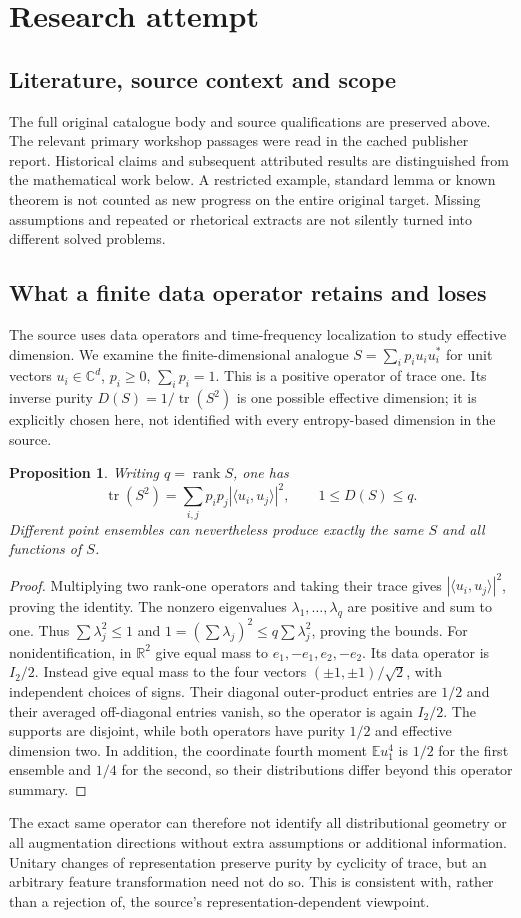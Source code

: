 \documentclass[11pt]{article}
\newtheorem{proposition}{Proposition}
\begin{document}
\section{Research attempt}
\subsection{Literature, source context and scope}
The full original catalogue body and source qualifications are preserved above. The relevant primary workshop passages were read in the cached publisher report. Historical claims and subsequent attributed results are distinguished from the mathematical work below. A restricted example, standard lemma or known theorem is not counted as new progress on the entire original target. Missing assumptions and repeated or rhetorical extracts are not silently turned into different solved problems.

\subsection{What a finite data operator retains and loses}
The source uses data operators and time-frequency localization to study effective dimension. We examine the finite-dimensional analogue $S=\sum_i p_i u_i u_i^*$ for unit vectors $u_i\in\mathbb C^d$, $p_i\ge0$, $\sum_i p_i=1$. This is a positive operator of trace one. Its inverse purity $D(S)=1/\operatorname{tr}(S^2)$ is one possible effective dimension; it is explicitly chosen here, not identified with every entropy-based dimension in the source.
\begin{proposition}
Writing $q=\operatorname{rank}S$, one has
\[
\operatorname{tr}(S^2)=\sum_{i,j}p_ip_j|\langle u_i,u_j\rangle|^2,
\qquad1\le D(S)\le q.
\]
Different point ensembles can nevertheless produce exactly the same $S$ and all functions of $S$.
\end{proposition}
\begin{proof}
Multiplying two rank-one operators and taking their trace gives $|\langle u_i,u_j\rangle|^2$, proving the identity. The nonzero eigenvalues $\lambda_1,\ldots,\lambda_q$ are positive and sum to one. Thus $\sum\lambda_j^2\le1$ and $1=(\sum\lambda_j)^2\le q\sum\lambda_j^2$, proving the bounds.
For nonidentification, in $\mathbb R^2$ give equal mass to $e_1,-e_1,e_2,-e_2$. Its data operator is $I_2/2$. Instead give equal mass to the four vectors $(\pm1,\pm1)/\sqrt2$, with independent choices of signs. Their diagonal outer-product entries are $1/2$ and their averaged off-diagonal entries vanish, so the operator is again $I_2/2$. The supports are disjoint, while both operators have purity $1/2$ and effective dimension two. In addition, the coordinate fourth moment $\mathbb E u_1^4$ is $1/2$ for the first ensemble and $1/4$ for the second, so their distributions differ beyond this operator summary.
\end{proof}
The exact same operator can therefore not identify all distributional geometry or all augmentation directions without extra assumptions or additional information. Unitary changes of representation preserve purity by cyclicity of trace, but an arbitrary feature transformation need not do so. This is consistent with, rather than a rejection of, the source's representation-dependent viewpoint.
\end{document}
